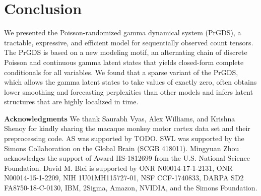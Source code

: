 \documentclass{article}
\begin{document}

\section{Conclusion} We presented the Poisson-randomized gamma dynamical system (PrGDS), a tractable, expressive, and efficient model for sequentially observed count tensors. The PrGDS is based on a new modeling motif, an alternating chain of discrete Poisson and continuous gamma latent states that yields closed-form complete conditionals for all variables. We found that a sparse variant of the PrGDS, which allows the gamma latent states to take values of exactly zero, often obtains lower smoothing and forecasting perplexities than other models and infers latent structures that are highly localized in time.


{\small
  \textbf{Acknowledgments} \;
  We thank Saurabh Vyas, Alex Williams, and Krishna Shenoy for kindly sharing the macaque monkey motor cortex data set and their preprocessing code.  AS was supported by TODO. SWL was supported by the Simons Collaboration on the Global Brain (SCGB 418011). Mingyuan Zhou acknowledges the support of Award IIS-1812699 from the U.S. National Science Foundation. David M. Blei is supported by ONR N00014-17-1-2131, ONR N00014-15-1-2209, NIH 1U01MH115727-01, NSF CCF-1740833, DARPA SD2 FA8750-18-C-0130, IBM, 2Sigma, Amazon, NVIDIA, and the Simons Foundation.}
\end{document}
